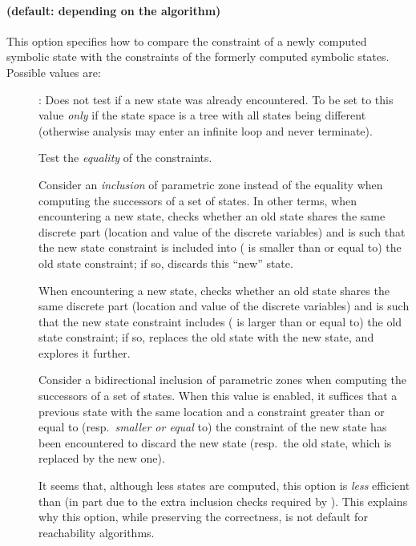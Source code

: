 \paragraph{ (default: depending on the algorithm)}
This option specifies how to compare the constraint of a newly computed symbolic state with the constraints of the formerly computed symbolic states.
Possible values are:
\begin{description}
	\item[]:
	Does not test if a new state was already encountered.
To be set to this value \emph{only} if the state space is a tree with all states being different (otherwise analysis may enter an infinite loop and never terminate).

	\item[]
	Test the \emph{equality} of the constraints.

	\item[]
Consider an \emph{inclusion} of parametric zone instead of the equality when computing the successors of a set of states.
In other terms, when encountering a new state, \imitator{} checks whether an old state shares the same discrete part (location and value of the discrete variables) and is such that the new state constraint is included into (\ie{} is smaller than or equal to) the old state constraint; if so, \imitator{} discards this ``new'' state.

	\item[]
When encountering a new state, \imitator{} checks whether an old state shares the same discrete part (location and value of the discrete variables) and is such that the new state constraint includes (\ie{} is larger than or equal to) the old state constraint; if so, \imitator{} replaces the old state with the new state, and explores it further.

	\item[]
Consider a bidirectional inclusion of parametric zones when computing the successors of a set of states.
When this value is enabled, it suffices that a previous state with the same location and a constraint greater than or equal to (resp.\ \emph{smaller or equal} to) the constraint of the new state has been encountered to discard the new state (resp.\ the old state, which is replaced by the new one).

It seems that, although less states are computed, this option is \emph{less} efficient than  (in part due to the extra inclusion checks required by ).
This explains why this option, while preserving the correctness, is not default for reachability algorithms.
\end{description}

